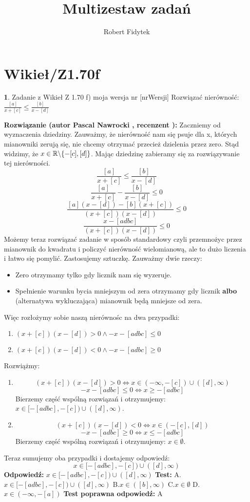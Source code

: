 \documentclass[12pt, a4paper]{article}
\title{Multizestaw zadań}
\author{Robert Fidytek}
\date{}
\theoremstyle{definition} %
\newtheorem{zad}{}
\newcommand{\kategoria}[1]{\section{#1}} %
\newcommand{\zadStart}[1]{\begin{zad}#1\newline} %
\newcommand{\zadStop}{\end{zad}}   %
\newcommand{\rozwStart}[2]{\noindent \textbf{Rozwiązanie (autor #1 , recenzent #2): }\newline} %
\newcommand{\odpStart}{\noindent \textbf{Odpowiedź:}\newline}    %
\newcommand{\odpStop}{\newline}                                             %
\newcommand{\testStart}{\noindent \textbf{Test:}\newline} %
\newcommand{\testStop}{\newline} %
\newcommand{\kluczStart}{\noindent \textbf{Test poprawna odpowiedź:}\newline} %
\newcommand{\kluczStop}{\newline} %
\begin{document}
\maketitle


\kategoria{Wikieł/Z1.70f}
\zadStart{Zadanie z Wikieł Z 1.70 f) moja wersja nr [nrWersji]}
Rozwiązać nierówność: $\frac{[a]}{x+[c]}\leq\frac{[b]}{x-[d]}$
\zadStop
\rozwStart{Pascal Nawrocki}{}
Zaczniemy od wyznaczenia dziedziny. Zauważmy, że nierówność nam się psuje dla x, których mianowniki zerują się, nie chcemy otrzymać przecież dzielenia przez zero. Stąd widzimy, że $x\in\mathbb{R}\symbol{92}\{-[c],[d]\}$. Mając dziedzinę zabieramy się za rozwiązywanie tej nierówności.
$$\frac{[a]}{x+[c]}\leq\frac{[b]}{x-[d]}$$
$$\frac{[a]}{x+[c]}-\frac{[b]}{x-[d]}\leq0$$
$$\frac{[a](x-[d])-[b](x+[c])}{(x+[c])(x-[d])}\leq0$$
$$\frac{x-[adbc]}{(x+[c])(x-[d])}\leq0$$
Możemy teraz rozwiązać zadanie w sposób standardowy czyli przemnożyc przez mianownik do kwadratu i policzyć nierówność wielomianową, ale to dużo liczenia i łatwo się pomylić. Zastosujemy sztuczkę. Zauważmy dwie rzeczy:
\begin{itemize}
\item Zero otrzymamy tylko gdy licznik nam się wyzeruje.
\item Spełnienie warunku bycia mniejszym od zera otrzymamy gdy licznik \textbf{albo} (alternatywa wykluczająca) mianownik będą mniejsze od zera. 
\end{itemize}
Więc rozłożymy sobie naszą nierównośc na dwa przypadki:
\begin{enumerate}
\item $(x+[c])(x-[d])>0 \wedge -x-[adbc]\leq0$
\item  $(x+[c])(x-[d])<0 \wedge -x-[adbc]\geq0$
\end{enumerate}
Rozwiążmy:
\begin{enumerate}
\item 
$$(x+[c])(x-[d])>0\Leftrightarrow x\in(-\infty,-[c])\cup([d],\infty)$$
$$-x-[adbc]\leq0\Leftrightarrow x\geq-[adbc]$$
Bierzemy część wspólną rozwiązań i otrzymujemy: $x\in[-[adbc],-[c])\cup([d],\infty)$.
\item 
$$(x+[c])(x-[d])<0\Leftrightarrow x\in(-[c],[d])$$
$$ -x-[adbc]\geq0\Leftrightarrow  x\leq-[adbc]$$
Bierzemy część wspólną rozwiązań i otrzymujemy: $x\in\emptyset$.
\end{enumerate}
Teraz sumujemy oba przypadki i dostajemy odpowiedź:
$$x\in[-[adbc],-[c])\cup([d],\infty)$$
\odpStart
$x\in[-[adbc],-[c])\cup([d],\infty)$
\odpStop
\testStart
A.$x\in[-[adbc],-[c])\cup([d],\infty)$
B.$x\in([b],\infty)$
C.$x\in\emptyset$
D.$x\in(-\infty,-[a])$
\testStop
\kluczStart
A
\kluczStop
\end{document}
